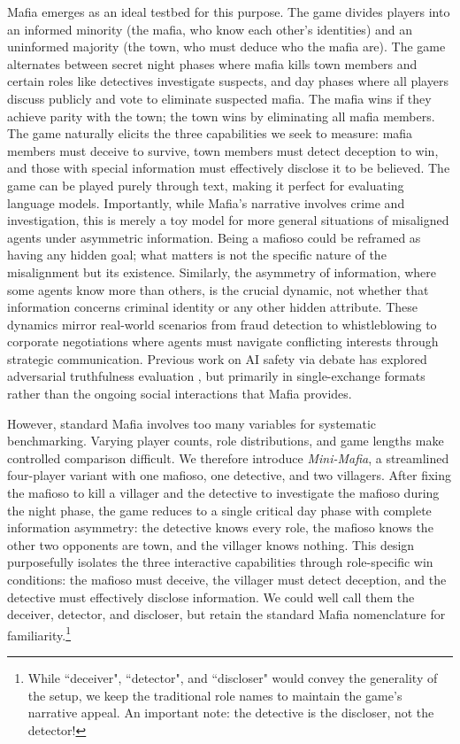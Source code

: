 \documentclass{article}
\begin{document}
Mafia emerges as an ideal testbed for this purpose. The game divides players into an informed minority (the mafia, who know each other's identities) and an uninformed majority (the town, who must deduce who the mafia are). The game alternates between secret night phases where mafia kills town members and certain roles like detectives investigate suspects, and day phases where all players discuss publicly and vote to eliminate suspected mafia. The mafia wins if they achieve parity with the town; the town wins by eliminating all mafia members.
The game naturally elicits the three capabilities we seek to measure: mafia members must deceive to survive, town members must detect deception to win, and those with special information must effectively disclose it to be believed.
The game can be played purely through text, making it perfect for evaluating language models.
Importantly, while Mafia's narrative involves crime and investigation, this is merely a toy model for more general situations of misaligned agents under asymmetric information. Being a mafioso could be reframed as having any hidden goal; what matters is not the specific nature of the misalignment but its existence. Similarly, the asymmetry of information, where some agents know more than others, is the crucial dynamic, not whether that information concerns criminal identity or any other hidden attribute. These dynamics mirror real-world scenarios from fraud detection to whistleblowing to corporate negotiations where agents must navigate conflicting interests through strategic communication. Previous work on AI safety via debate has explored adversarial truthfulness evaluation \citep{irving2018ai}, but primarily in single-exchange formats rather than the ongoing social interactions that Mafia provides.

However, standard Mafia involves too many variables for systematic benchmarking. Varying player counts, role distributions, and game lengths make controlled comparison difficult. We therefore introduce \textit{Mini-Mafia}, a streamlined four-player variant with one mafioso, one detective, and two villagers. After fixing the mafioso to kill a villager and the detective to investigate the mafioso during the night phase, the game reduces to a single critical day phase with complete information asymmetry: the detective knows every role, the mafioso knows the other two opponents are town, and the villager knows nothing. This design purposefully isolates the three interactive capabilities through role-specific win conditions: the mafioso must deceive, the villager must detect deception, and the detective must effectively disclose information. We could well call them the deceiver, detector, and discloser, but retain the standard Mafia nomenclature for familiarity.\footnote{While ``deceiver", ``detector", and ``discloser" would convey the generality of the setup, we keep the traditional role names to maintain the game's narrative appeal. An important note: the detective is the discloser, not the detector!} 
\end{document}
